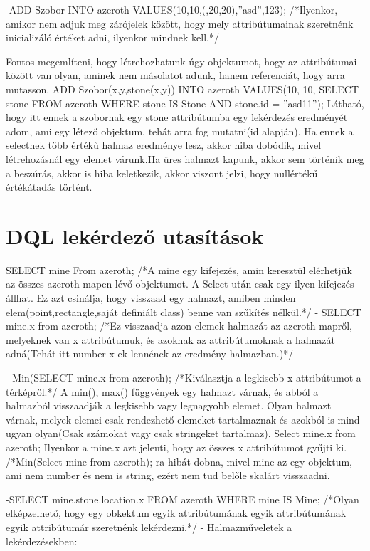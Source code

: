 -ADD Szobor INTO azeroth VALUES(10,10,(,20,20),”asd”,123);  /*Ilyenkor, amikor nem adjuk meg zárójelek között, hogy mely attribútumainak szeretnénk inicializáló értéket adni, ilyenkor mindnek kell.*/

Fontos megemlíteni, hogy létrehozhatunk úgy objektumot, hogy az attribútumai között van olyan, aminek nem másolatot adunk, hanem referenciát, hogy arra mutasson.
ADD Szobor(x,y,stone(x,y)) INTO azeroth VALUES(10, 10, SELECT stone FROM azeroth WHERE stone IS Stone AND stone.id = ”asd11”);
Látható, hogy itt ennek a szobornak egy stone attribútumba egy lekérdezés eredményét adom, ami egy létező objektum, tehát arra fog mutatni(id alapján).
Ha ennek a selectnek több értékű halmaz eredménye lesz, akkor hiba dobódik, mivel létrehozásnál egy elemet várunk.Ha üres halmazt kapunk, akkor sem történik meg a beszúrás, akkor is hiba keletkezik, akkor viszont jelzi, hogy nullértékű értékátadás történt.

\section{DQL lekérdező utasítások}

SELECT mine From azeroth;  /*A mine egy kifejezés, amin keresztül elérhetjük az összes  azeroth mapen lévő objektumot. A Select után csak egy ilyen kifejezés állhat. Ez azt csinálja, hogy visszaad egy halmazt, amiben minden elem(point,rectangle,saját definiált class) benne van szűkítés nélkül.*/
- SELECT mine.x from azeroth;  /*Ez visszaadja azon elemek halmazát az azeroth mapről, melyeknek van x attribútumuk, és azoknak az attribútumoknak a halmazát adná(Tehát itt number x-ek lennének az eredmény halmazban.)*/

- Min(SELECT mine.x from azeroth);  /*Kiválasztja a legkisebb x attribútumot a térképről.*/
A min(), max() függvények egy halmazt várnak, és abból a halmazból visszaadják a legkisebb vagy legnagyobb elemet. Olyan halmazt várnak, melyek elemei csak rendezhető elemeket tartalmaznak és azokból is mind ugyan olyan(Csak számokat vagy csak stringeket tartalmaz).
Select mine.x from azeroth;  Ilyenkor a mine.x  azt jelenti, hogy az összes x attribútumot gyűjti ki.
/*Min(Select mine from azeroth);-ra hibát dobna, mivel mine az egy objektum, ami nem number és nem is string, ezért nem tud belőle skalárt visszaadni.

-SELECT mine.stone.location.x FROM azeroth WHERE mine IS Mine; /*Olyan elképzelhető, hogy egy obkektum egyik attribútumának egyik attribútumának egyik attribútumár szeretnénk lekérdezni.*/
- Halmazműveletek a lekérdezésekben:

